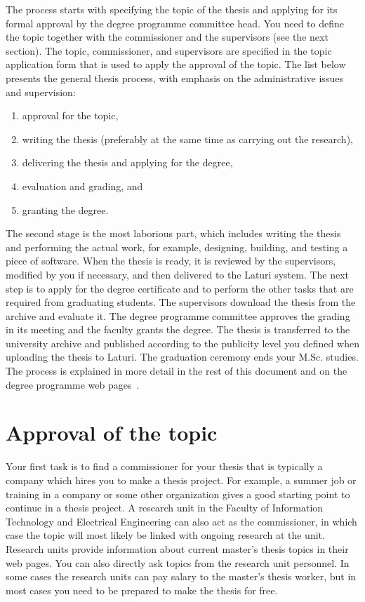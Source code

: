 The process starts with specifying the topic of the thesis and applying for its formal approval by the degree programme committee head. You need to define the topic together with the commissioner and the supervisors (see the next section). The topic, commissioner, and supervisors are specified in the topic application form that is used to apply the approval of the topic. The list below presents the general thesis process, with emphasis on the administrative issues and supervision:

\begin{enumerate}
    \setlength\itemsep{0pt}
    \setlength\parskip{0pt}
    \item approval for the topic,
    \item writing the thesis (preferably at the same time as carrying out the research),
    \item delivering the thesis and applying for the degree,
    \item evaluation and grading, and
    \item granting the degree.
\end{enumerate}

The second stage is the most laborious part, which includes writing the thesis and performing the actual work, for example, designing, building, and testing a piece of software. When the thesis is ready, it is reviewed by the supervisors, modified by you if necessary, and then delivered to the Laturi system. The next step is to apply for the degree certificate and to perform the other tasks that are required from graduating students. The supervisors download the thesis from the archive and evaluate it. The degree programme committee approves the grading in its meeting and the faculty grants the degree. The thesis is transferred to the university archive and published according to the publicity level you defined when uploading the thesis to Laturi. The graduation ceremony ends your M.Sc. studies. The process is explained in more detail in the rest of this document and on the degree programme web pages~\cite{mscstudies}.

\section{Approval of the topic}

Your first task is to find a commissioner for your thesis that is typically a company which hires you to make a thesis project. For example, a summer job or training in a company or some other organization gives a good starting point to continue in a thesis project. A research unit in the Faculty of Information Technology and Electrical Engineering can also act as the commissioner, in which case the topic will most likely be linked with ongoing research at the unit. Research units provide information about current master’s thesis topics in their web pages. You can also directly ask topics from the research unit personnel. In some cases the research units can pay salary to the master’s thesis worker, but in most cases you need to be prepared to make the thesis for free.

